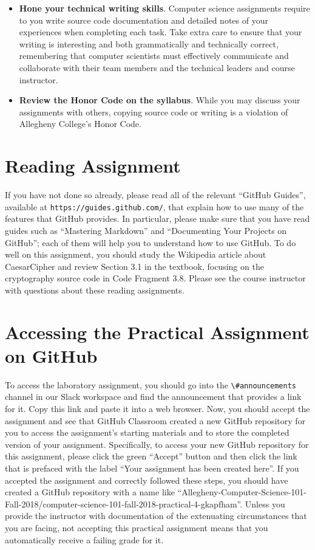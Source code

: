 \documentclass[11pt]{article}
\newcommand{\url}[1]{\lstinline{#1}}
\newcommand{\channel}[1]{\lstinline{#1}}
\begin{document}
\begin{itemize}
\item {\bf Hone your technical writing skills}. Computer science assignments
  require to you write source code documentation and detailed notes of your
  experiences when completing each task. Take extra care to ensure that your
  writing is interesting and both grammatically and technically correct,
  remembering that computer scientists must effectively communicate and
  collaborate with their team members and the technical leaders and course
  instructor.

\item {\bf Review the Honor Code on the syllabus}. While you may discuss your
  assignments with others, copying source code or writing is a violation of
  Allegheny College's Honor Code.

\end{itemize}


\section*{Reading Assignment}

If you have not done so already, please read all of the relevant ``GitHub
Guides'', available at \url{https://guides.github.com/}, that explain how to use
many of the features that GitHub provides. In particular, please make sure that
you have read guides such as ``Mastering Markdown'' and ``Documenting Your
Projects on GitHub''; each of them will help you to understand how to use
GitHub. To do well on this assignment, you should study the Wikipedia article
about CaesarCipher and review Section 3.1 in the textbook, focusing on the
cryptography source code in Code Fragment 3.8. Please see the course instructor
with questions about these reading assignments.

\section*{Accessing the Practical Assignment on GitHub}

To access the laboratory assignment, you should go into the
\channel{\#announcements} channel in our Slack workspace and find the announcement
that provides a link for it. Copy this link and paste it into a web browser.
Now, you should accept the assignment and see that GitHub Classroom created a
new GitHub repository for you to access the assignment's starting materials and
to store the completed version of your assignment. Specifically, to access your
new GitHub repository for this assignment, please click the green ``Accept''
button and then click the link that is prefaced with the label ``Your
assignment has been created here''. If you accepted the assignment and
correctly followed these steps, you should have created a GitHub repository
with a name like
``Allegheny-Computer-Science-101-Fall-2018/computer-science-101-fall-2018-practical-4-gkapfham''.
Unless you provide the instructor with documentation of the extenuating
circumstances that you are facing, not accepting this practical assignment
means that you automatically receive a failing grade for it.
\end{document}
